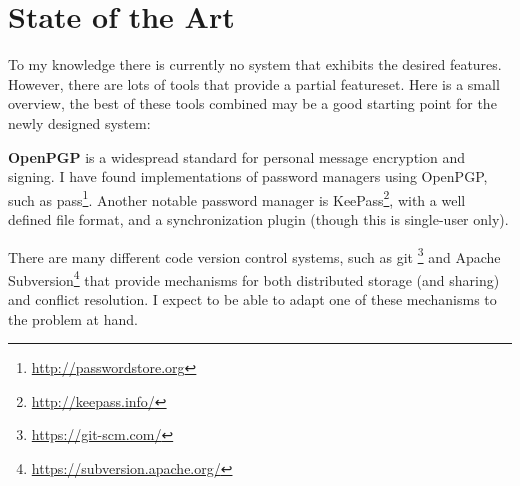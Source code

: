 \section{State of the Art}

To my knowledge there is currently no system that exhibits the desired
features. However, there are lots of tools that provide a partial featureset.
Here is a small overview, the best of these tools combined may be a good
starting point for the newly designed system:

\textbf{OpenPGP}\cite{openpgp} is a widespread standard for personal message
encryption and signing. I have found implementations of password managers using
OpenPGP, such as pass\footnote{\url{http://passwordstore.org}}. Another notable
password manager is KeePass\footnote{\url{http://keepass.info/}}, with a well
defined file format, and a synchronization plugin (though this is single-user
only).

There are many different code version control systems, such as git
\footnote{\url{https://git-scm.com/}} and Apache
Subversion\footnote{\url{https://subversion.apache.org/}} that provide
mechanisms for both distributed storage (and sharing) and conflict resolution.
I expect to be able to adapt one of these mechanisms to the problem at hand.
